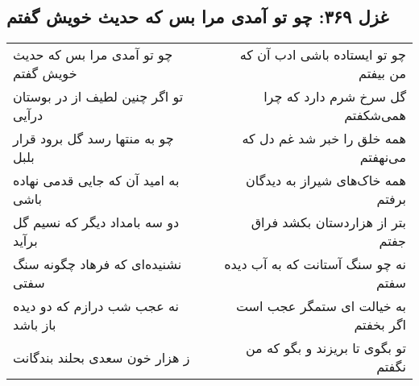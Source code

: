\begin{center}
\section*{غزل ۳۶۹: چو تو آمدی مرا بس که حدیث خویش گفتم}
\label{sec:369}
\begin{longtable}{l p{0.5cm} r}
چو تو آمدی مرا بس که حدیث خویش گفتم
&&
چو تو ایستاده باشی ادب آن که من بیفتم
\\
تو اگر چنین لطیف از در بوستان درآیی
&&
گل سرخ شرم دارد که چرا همی‌شکفتم
\\
چو به منتها رسد گل برود قرار بلبل
&&
همه خلق را خبر شد غم دل که می‌نهفتم
\\
به امید آن که جایی قدمی نهاده باشی
&&
همه خاک‌های شیراز به دیدگان برفتم
\\
دو سه بامداد دیگر که نسیم گل برآید
&&
بتر از هزاردستان بکشد فراق جفتم
\\
نشنیده‌ای که فرهاد چگونه سنگ سفتی
&&
نه چو سنگ آستانت که به آب دیده سفتم
\\
نه عجب شب درازم که دو دیده باز باشد
&&
به خیالت ای ستمگر عجب است اگر بخفتم
\\
ز هزار خون سعدی بحلند بندگانت
&&
تو بگوی تا بریزند و بگو که من نگفتم
\\
\end{longtable}
\end{center}
